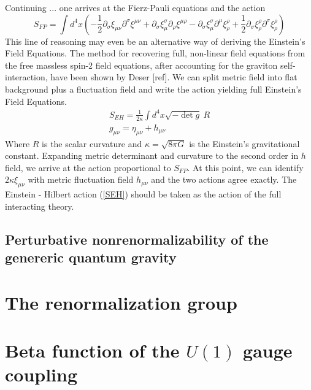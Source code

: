 \documentclass[11pt, a4paper]{article}
\begin{document}
Continuing ... one arrives at the Fierz-Pauli equations and the action
\begin{equation}
    S_{FP} = \int d^4 x \left( -\frac{1}{2} \partial_\sigma \xi_{\mu\nu} \partial^\sigma \xi^{\mu\nu} +  \partial_\sigma \xi_\mu^\sigma \partial_\rho \xi^{\mu\rho} - \partial_\sigma \xi_\mu^\sigma \partial^\mu \xi_\rho^\rho +\frac{1}{2} \partial_\sigma \xi_\rho^\rho \partial^\sigma \xi_\rho^\rho \right)
    \label{SFP}
\end{equation}
This line of reasoning may even be an alternative way of deriving the Einstein's Field Equations. The method for recovering full, non-linear
field equations from the free massless spin-2 field equations, after accounting for the graviton self-interaction, have been shown by Deser [ref]. 
We can split metric field into flat background plus a fluctuation field and write the action yielding full Einstein's Field Equations.
\begin{gather}
    S_{EH} = \frac{1}{2 \kappa} \int d^4 x \sqrt{-\det{g}} \ R 
    \label{SEH} \\
    g_{\mu\nu} = \eta_{\mu\nu} + h_{\mu\nu}
\end{gather}
Where $R$ is the scalar curvature and $\kappa = \sqrt{8 \pi G}$ is the Einstein's gravitational constant. Expanding metric determinant and curvature to the second order in $h$ field, we arrive at the action proportional to $S_{FP}$.
At this point, we can identify $2\kappa\xi_{\mu\nu}$ with metric fluctuation field $h_{\mu\nu}$ and the two actions agree exactly.
The Einstein - Hilbert action (\ref{SEH}) should be taken as the action of the full interacting theory.

\subsection*{\centering Perturbative nonrenormalizability of the genereric quantum gravity}

\section{The renormalization group}

\section{Beta function of the $U(1)$ gauge coupling}
\end{document}
